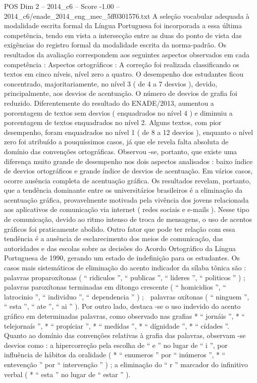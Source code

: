 \begin{textsample}{POS Dim 2 – 2014\_c6 – Score -1.00 – 2014\_c6/enade\_2014\_eng\_mec\_5ff0301576.txt}
A seleção vocabular adequada à modalidade escrita formal da Língua Portuguesa foi incorporada a essa última competência, tendo em vista a intersecção entre as duas do ponto de vista das exigências do registro formal da modalidade escrita da norma-padrão.
Os resultados da avaliação correspondem aos seguintes aspectos observados em cada competência : Aspectos ortográficos : A correção foi realizada classificando os textos em cinco níveis, nível zero a quatro.
O desempenho dos estudantes ficou concentrado, majoritariamente, no nível 3 ( de 4 a 7 desvios ), devido, principalmente, aos desvios de acentuação.
O número de desvios de grafia foi reduzido.
Diferentemente do resultado do ENADE/2013, aumentou a porcentagem de textos sem desvios ( enquadrados no nível 4 ) e diminuiu a porcentagem de textos enquadrados no nível 2.
Alguns textos, com pior desempenho, foram enquadrados no nível 1 ( de 8 a 12 desvios ), enquanto o nível zero foi atribuído a pouquíssimos casos, já que ele revela falta absoluta de domínio das convenções ortográficas.
Observou -se, portanto, que existe uma diferença muito grande de desempenho nos dois aspectos analisados : baixo índice de desvios ortográficos e grande índice de desvios de acentuação.
Em vários casos, ocorre ausência completa de acentuação gráfica.
Os resultados revelam, portanto, que a tendência dominante entre os universitários brasileiros é a eliminação da acentuação gráfica, provavelmente motivada pela vivência dos jovens relacionada aos aplicativos de comunicação via internet ( redes sociais e e-mails ).
Nesse tipo de comunicação, devido ao ritmo intenso de troca de mensagens, o uso de acentos gráficos foi praticamente abolido.
Outro fator que pode ter relação com essa tendência é a ausência de esclarecimento dos meios de comunicação, das autoridades e das escolas sobre as decisões do Acordo Ortográfico da Língua Portuguesa de 1990, gerando um estado de indefinição para os estudantes.
Os casos mais sistemáticos de eliminação do acento indicador da sílaba tônica são :  palavras proparoxítonas ( “ ridiculos ”, “ publicas ”, “ lideres ”, “ politicos ” ) ;  palavras paroxítonas terminadas em ditongo crescente ( “ homicidios ”, “ latrocinio ”, “ individuo ”, “ dependencia ” ) ;  palavras oxítonas ( “ ninguem ”, “ esta ”, “ ate ”, “ ai ” ).
Por outro lado, destaca -se o uso indevido do acento gráfico em determinadas palavras, como observado nas grafias * “ jornáis ”, * “ telejornaís ”, * “ propíciar ”, * “ medídas ”, * “ dígnidade ”, * “ cídades ”.
Quanto ao domínio das convenções relativas à grafia das palavras, observam -se desvios como : a hipercorreção pela escolha de “ e ” no lugar de “ i ”, por influência de hábitos da oralidade ( * “ enumeros ” por “ inúmeros ”, * “ entevenção ” por “ intervenção ” ) ; a eliminação do “ r ” marcador do infinitivo verbal ( * “ esta ” no lugar de “ estar ” ).

\end{textsample}
